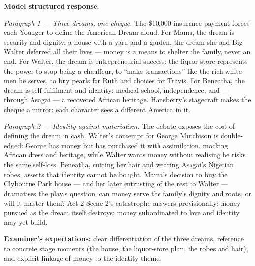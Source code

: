 \documentclass[11pt]{article}
\newcommand{\cle}[1]{{\popxbold\color{popdark}#1}}
\begin{document}
\begin{corrige}
\textbf{Model structured response.}

\emph{Paragraph 1 --- Three dreams, one cheque.} The \$10{,}000 insurance payment forces each Younger to define the American Dream aloud. For Mama, the dream is \cle{security and dignity}: a house with a yard and a garden, the dream she and Big Walter deferred all their lives --- money is a means to shelter the family, never an end. For Walter, the dream is \cle{entrepreneurial success}: the liquor store represents the power to stop being a chauffeur, to ``make transactions'' like the rich white men he serves, to buy pearls for Ruth and choices for Travis. For Beneatha, the dream is \cle{self-fulfilment and identity}: medical school, independence, and --- through Asagai --- a recovered African heritage. Hansberry's stagecraft makes the cheque a mirror: each character sees a different America in it.

\emph{Paragraph 2 --- Identity against materialism.} The debate exposes the cost of defining the dream in cash. Walter's contempt for George Murchison is double-edged: George has money but has purchased it with assimilation, mocking African dress and heritage, while Walter wants money without realising he risks the same self-loss. Beneatha, cutting her hair and wearing Asagai's Nigerian robes, asserts that identity cannot be bought. Mama's decision to buy the Clybourne Park house --- and her later entrusting of the rest to Walter --- dramatises the play's question: can money serve the family's dignity and roots, or will it master them? Act 2 Scene 2's catastrophe answers provisionally: money pursued as the dream itself destroys; money subordinated to love and identity may yet build.

\textbf{Examiner's expectations:} clear differentiation of the three dreams, reference to concrete stage moments (the house, the liquor-store plan, the robes and hair), and explicit linkage of money to the identity theme.
\end{corrige}
\end{document}
